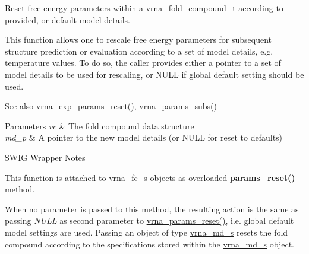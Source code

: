 Reset free energy parameters within a \mbox{\hyperlink{group__fold__compound_ga1b0cef17fd40466cef5968eaeeff6166}{vrna\+\_\+fold\+\_\+compound\+\_\+t}} according to provided, or default model details. 

This function allows one to rescale free energy parameters for subsequent structure prediction or evaluation according to a set of model details, e.\+g. temperature values. To do so, the caller provides either a pointer to a set of model details to be used for rescaling, or N\+U\+LL if global default setting should be used.

\begin{DoxySeeAlso}{See also}
\mbox{\hyperlink{group__energy__parameters_gaa5409218068be84d7b50c78fbdaa85a9}{vrna\+\_\+exp\+\_\+params\+\_\+reset()}}, vrna\+\_\+params\+\_\+subs() 
\end{DoxySeeAlso}

\begin{DoxyParams}{Parameters}
{\em vc} & The fold compound data structure \\
\hline
{\em md\+\_\+p} & A pointer to the new model details (or N\+U\+LL for reset to defaults)\\
\hline
\end{DoxyParams}
\begin{DoxyRefDesc}{S\+W\+I\+G Wrapper Notes}
\item[\mbox{\hyperlink{wrappers__wrappers000081}{S\+W\+I\+G Wrapper Notes}}]This function is attached to \mbox{\hyperlink{group__fold__compound_structvrna__fc__s}{vrna\+\_\+fc\+\_\+s}} objects as overloaded {\bfseries params\+\_\+reset()} method.

When no parameter is passed to this method, the resulting action is the same as passing {\itshape N\+U\+LL} as second parameter to \mbox{\hyperlink{group__energy__parameters_gac40dc82e48a72a97cfc58b9da08a7792}{vrna\+\_\+params\+\_\+reset()}}, i.\+e. global default model settings are used. Passing an object of type \mbox{\hyperlink{group__model__details_structvrna__md__s}{vrna\+\_\+md\+\_\+s}} resets the fold compound according to the specifications stored within the \mbox{\hyperlink{group__model__details_structvrna__md__s}{vrna\+\_\+md\+\_\+s}} object. \end{DoxyRefDesc}
\mbox{\label{group__energy__parameters_gaa5409218068be84d7b50c78fbdaa85a9}} 

